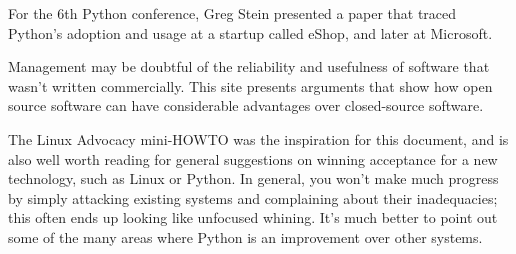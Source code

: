 \documentclass{howto}
\begin{document}
\begin{definitions}
For the 6th Python conference, Greg Stein presented a paper that
traced Python's adoption and usage at a startup called eShop, and
later at Microsoft.


Management may be doubtful of the reliability and usefulness of
software that wasn't written commercially.  This site presents
arguments that show how open source software can have considerable
advantages over closed-source software.


The Linux Advocacy mini-HOWTO was the inspiration for this document,
and is also well worth reading for general suggestions on winning
acceptance for a new technology, such as Linux or Python.  In general,
you won't make much progress by simply attacking existing systems and
complaining about their inadequacies; this often ends up looking like
unfocused whining.  It's much better to point out some of the many
areas where Python is an improvement over other systems.  

\end{definitions}
\end{document}

